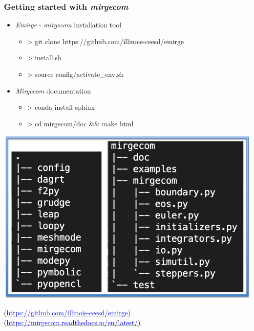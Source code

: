 \begin{frame}\frametitle{Getting started with \textit{mirgecom}}
\begin{multicols}{2}
\begin{itemize}
  \item \textit{Emirge} - \textit{mirgecom} installation tool
  \begin{itemize}
    \item > git clone https://github.com/illinois-ceesd/emirge
    \item > install.sh
    \item > source config/activate\_env.sh
  \end{itemize}
  \item \textit{Mirgecom} documentation
  \begin{itemize}
    \item > conda install sphinx
    \item > cd mirgecom/doc \&\& make html
  \end{itemize}
\end{itemize}
\includegraphics[width=.5\textwidth]{figures/dir_trees.png}
\end{multicols}
\begin{center}
\href{https://github.com/illinois-ceesd/emirge}{(\textcolor{blue}{https://github.com/illinois-ceesd/emirge})}
\href{https://mirgecom.readthedocs.io/en/latest/}{(\textcolor{blue}{https://mirgecom.readthedocs.io/en/latest/})}
\end{center}
\end{frame}


